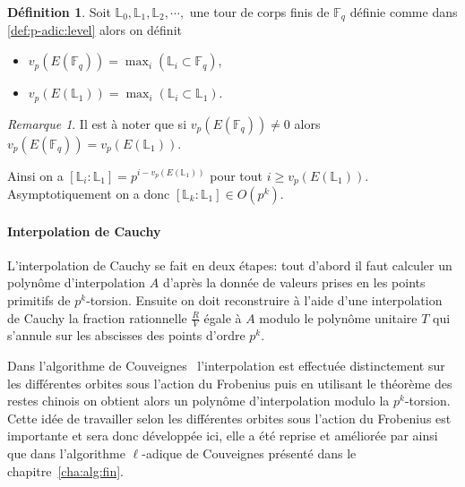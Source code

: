\documentclass[10pt,a4paper]{book}
\theoremstyle{plain}
\theoremstyle{definition}
\theoremstyle{definition}
\theoremstyle{definition}
\theoremstyle{definition}
\theoremstyle{definition}
\newtheorem{defi}[thm]{Définition}
\theoremstyle{remark}
\newtheorem{rem}[thm]{Remarque}
\theoremstyle{remark}
\theoremstyle{definition}
\begin{document}

\begin{defi}
Soit $\mathbb{L}_0, \mathbb{L}_1, \mathbb{L}_2, \cdots, $ une tour de corps 
finis de $\mathbb{F}_q$ définie comme dans \ref{def:p-adic:level} alors on 
définit
\begin{itemize}
\item $v_p(E(\mathbb{F}_q))=\max_i\left( \mathbb{L}_i \subset \mathbb{F}_q \right)$,
\item $v_p(E(\mathbb{L}_1))=\max_i\left( \mathbb{L}_i \subset \mathbb{L}_1 \right)$.
\end{itemize}
\end{defi}

\begin{rem}
Il est à noter que si $v_p(E(\mathbb{F}_q)) \neq 0$ alors $v_p(E(\mathbb{F}_q))=v_p(E(\mathbb{L}_1))$.
\end{rem}

Ainsi on a $[\mathbb{L}_i:\mathbb{L}_1]=p^{i- v_p(E(\mathbb{L}_1))}$ pour tout $i \geqslant  v_p(E(\mathbb{L}_1))$. Asymptotiquement on a donc $[\mathbb{L}_k:\mathbb{L}_1] \in O(p^k)$.



\paragraph{Interpolation de Cauchy} L'interpolation de Cauchy se fait en deux étapes: tout d'abord il faut calculer un polynôme d'interpolation $A$ d'après la donnée de valeurs prises en les points primitifs de $p^k$-torsion. Ensuite on doit reconstruire à l'aide d'une interpolation de Cauchy la fraction rationnelle $\frac{R}{V}$ égale à $A$ modulo le polynôme unitaire $T$ qui s'annule sur les abscisses des points d'ordre $p^k$. 

Dans l'algorithme de Couveignes~\cite{Couveignes96} l'interpolation est 
effectuée distinctement sur les différentes orbites sous l'action du Frobenius 
puis en utilisant le théorème des restes chinois on obtient alors un polynôme 
d'interpolation modulo la $p^k$-torsion. Cette idée de travailler selon les 
différentes orbites sous l'action du Frobenius est importante et sera donc 
développée ici, elle a été reprise et améliorée par \cite{DeFeo11} ainsi que 
dans l'algorithme $\ell$-adique de Couveignes présenté dans le 
chapitre~\ref{cha:alg:fin}.
\end{document}
